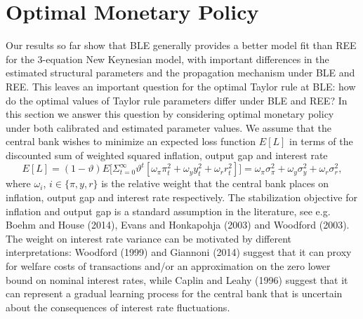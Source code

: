 
\section{Optimal Monetary Policy}
\label{sec:MonPol}

Our results so far show that BLE generally provides a better model fit than REE for the 3-equation New Keynesian model, with important differences in the estimated structural parameters and the propagation mechanism under BLE and REE. This leaves an important question for the optimal Taylor rule at BLE: how do the optimal values of Taylor rule parameters differ under BLE and REE? In this section we answer this question by considering optimal monetary policy under both calibrated and estimated parameter values.
We assume that the central bank wishes to minimize an expected loss function $E[L]$ in terms of the discounted sum of weighted squared inflation, output gap and interest rate
\begin{equation}
E[L]=(1-\vartheta)E\Big[\Sigma_{t=0}^\infty  \vartheta^t[\omega_{\pi} \pi_t^2+\omega_yy_t^2+\omega_r r_t^2] \Big]=\omega_{\pi} \sigma_\pi^2+\omega_y\sigma_y^2+\omega_r\sigma_r^2,\label{varobj}
\end{equation}
where $\omega_i$, $i \in \{\pi,y,r \}$ is the relative weight that the central bank places on inflation, output gap and interest rate respectively. The stabilization objective for inflation and output gap is a standard assumption in the literature, see e.g.  Boehm and House (2014), Evans and Honkapohja (2003) and Woodford (2003). The weight on interest rate variance can be motivated by different interpretations: Woodford (1999) and Giannoni (2014) suggest that it can proxy for welfare costs of transactions and/or an approximation on the zero lower bound on nominal interest rates, while Caplin and Leahy (1996) suggest that it can represent a gradual learning process for the central bank that is uncertain about the consequences of interest rate fluctuations. 

